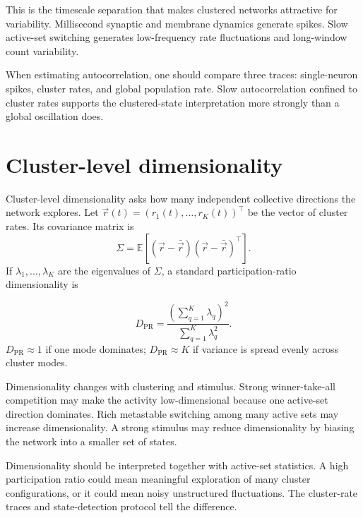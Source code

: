 This is the timescale separation that makes clustered networks attractive for variability. Millisecond synaptic and membrane dynamics generate spikes. Slow active-set switching generates low-frequency rate fluctuations and long-window count variability.

When estimating autocorrelation, one should compare three traces: single-neuron spikes, cluster rates, and global population rate. Slow autocorrelation confined to cluster rates supports the clustered-state interpretation more strongly than a global oscillation does.

\section{Cluster-level dimensionality}
\label{sec:cluster-level-dimensionality}

Cluster-level dimensionality asks how many independent collective directions the network explores. Let $\vec r(t)=(r_1(t),\ldots,r_K(t))^\top$ be the vector of cluster rates. Its covariance matrix is
%
\begin{equation}
  \Sigma
  =
  \mathbb{E}\!\left[
    (\vec r-\bar{\vec r})(\vec r-\bar{\vec r})^\top
  \right].
  \label{eq:cluster-covariance-matrix}
\end{equation}
%
If $\lambda_1,\ldots,\lambda_K$ are the eigenvalues of $\Sigma$, a standard participation-ratio dimensionality is
%
\begin{keyequation}
\begin{equation}
  D_{\mathrm{PR}}
  =
  \frac{\left(\sum_{q=1}^{K}\lambda_q\right)^2}
       {\sum_{q=1}^{K}\lambda_q^2}.
  \label{eq:participation-ratio-dimensionality}
\end{equation}
\tcblower
$D_{\mathrm{PR}}\approx1$ if one mode dominates; $D_{\mathrm{PR}}\approx K$ if variance is spread evenly across cluster modes.
\end{keyequation}

\noindent Dimensionality changes with clustering and stimulus. Strong winner-take-all competition may make the activity low-dimensional because one active-set direction dominates. Rich metastable switching among many active sets may increase dimensionality. A strong stimulus may reduce dimensionality by biasing the network into a smaller set of states.

Dimensionality should be interpreted together with active-set statistics. A high participation ratio could mean meaningful exploration of many cluster configurations, or it could mean noisy unstructured fluctuations. The cluster-rate traces and state-detection protocol tell the difference.

